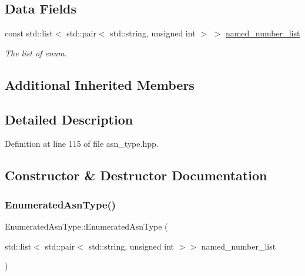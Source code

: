 \subsection*{Data Fields}
\begin{DoxyCompactItemize}
\item 
const std\+::list$<$ std\+::pair$<$ std\+::string, unsigned int $>$ $>$ \hyperlink{classEnumeratedAsnType_a7393f9a5ef4fe7295453e1eb16b3607a}{named\+\_\+number\+\_\+list}
\begin{DoxyCompactList}\small\item\em The list of enum. \end{DoxyCompactList}\end{DoxyCompactItemize}
\subsection*{Additional Inherited Members}


\subsection{Detailed Description}


Definition at line 115 of file asn\+\_\+type.\+hpp.



\subsection{Constructor \& Destructor Documentation}
\mbox{\label{classEnumeratedAsnType_a096266b08e601a619f200239f883c3c6}} 
\subsubsection{\texorpdfstring{Enumerated\+Asn\+Type()}{EnumeratedAsnType()}}
{\footnotesize\ttfamily Enumerated\+Asn\+Type\+::\+Enumerated\+Asn\+Type (\begin{DoxyParamCaption}\item[{std\+::list$<$ std\+::pair$<$ std\+::string, unsigned int $>$$>$}]{named\+\_\+number\+\_\+list }\end{DoxyParamCaption})\hspace{0.3cm}{\ttfamily [explicit]}}



